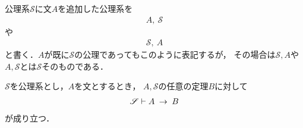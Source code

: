 	公理系$\mathscr{S}$に文$A$を追加した公理系を
	\begin{align}
		A,\ \mathscr{S}
	\end{align}
	や
	\begin{align}
		\mathscr{S},\ A
	\end{align}
	と書く．$A$が既に$\mathscr{S}$の公理であってもこのように表記するが，
	その場合は$\mathscr{S}, A$や$A,\mathscr{S}$とは$\mathscr{S}$そのものである．
	
	\begin{screen}
		\begin{metathm}[演繹定理]\label{metathm:deduction_theorem}
			$\mathscr{S}$を公理系とし，$A$を文とするとき，
			$A,\mathscr{S}$の任意の定理$B$に対して
			\begin{align}
				\mathscr{S} \vdash A \hspace{0.25em}\rightarrow\hspace{0.25em} B
			\end{align}
			が成り立つ．
		\end{metathm}
	\end{screen}
	

